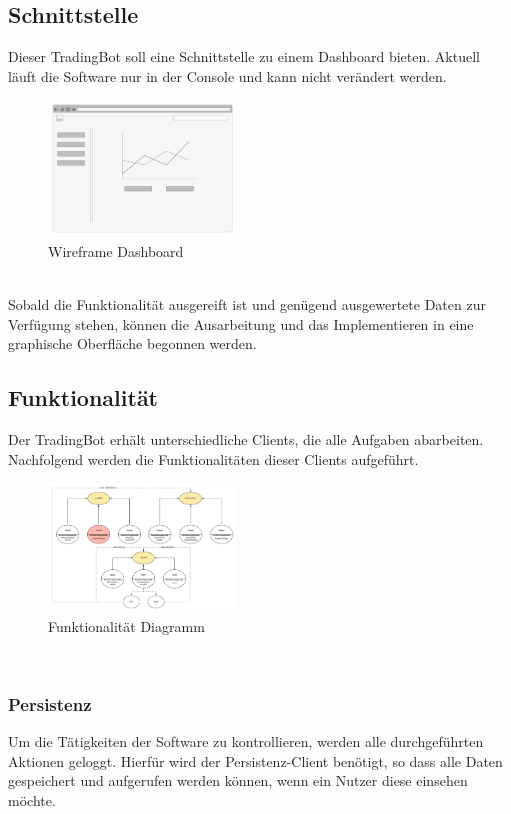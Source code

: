 \subsection{Schnittstelle}
Dieser TradingBot soll eine Schnittstelle zu einem Dashboard bieten. Aktuell läuft die Software nur in der Console und kann nicht verändert werden.
\begin{figure}[ht]
\includegraphics[width=5cm]{bot/wireframe_bot}
\caption{Wireframe Dashboard}
\label{Wireframe_Dashboard}
\end{figure}
\\
Sobald die Funktionalität ausgereift ist und genügend ausgewertete Daten zur Verfügung stehen, können die Ausarbeitung und das Implementieren in eine graphische Oberfläche begonnen werden.

\subsection{Funktionalität}
Der TradingBot erhält unterschiedliche Clients, die alle Aufgaben abarbeiten. Nachfolgend werden die Funktionalitäten dieser Clients aufgeführt.
\begin{figure}[ht]
\includegraphics[width=5cm]{bot/funktionen_diagramm}
\caption{Funktionalität Diagramm}
\label{Funktionalität_Diagramm}
\end{figure}
\\
\subsubsection{Persistenz}
Um die Tätigkeiten der Software zu kontrollieren, werden alle durchgeführten Aktionen geloggt. Hierfür wird der Persistenz-Client benötigt, so dass alle Daten gespeichert und aufgerufen werden können, wenn ein Nutzer diese einsehen möchte.
